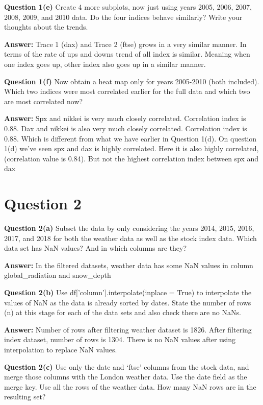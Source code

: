\documentclass[letterpaper,12pt]{article}
\begin{document}
\noindent \textbf{Question 1(e)} Create 4 more subplots, now just using years 2005, 2006, 2007, 2008, 2009, and 2010 data. Do the four indices behave similarly? Write your thoughts about the trends.

\textbf{Answer:} Trace 1 (dax) and Trace 2 (ftse) grows in a very similar manner. In terms of the rate of ups and downs trend of all index is similar. Meaning when one index goes up, other index also goes up in a similar manner. 

\noindent \textbf{Question 1(f)} Now obtain a heat map only for years 2005-2010 (both included). Which two indices were most correlated earlier for the full data and which two are most correlated now? 

\textbf{Answer:} Spx and nikkei is very much closely correlated. Correlation index is 0.88. Dax and nikkei is also very much closely correlated. Correlation index is 0.88. Which is different from what we have earlier in Question 1(d).
On question 1(d) we've seen spx and dax is highly correlated. Here it is also highly correlated, (correlation value is 0.84).
But not the highest correlation index between spx and dax

\section*{Question 2}
\noindent \textbf{Question 2(a)} Subset the data by only considering the years 2014, 2015, 2016, 2017, and 2018 for both the weather data as well as the stock index data. Which data set has NaN values? And in which columns are they? 

\textbf{Answer:} In the filtered datasets, weather data has some NaN values in column global\_radiation and snow\_depth

\noindent \textbf{Question 2(b)} Use df[’column’].interpolate(inplace = True) to interpolate the values of NaN as the data is already sorted by dates. State the number of rows (n) at this stage for each of the data sets and also check there are no NaNs. 

\textbf{Answer:} Number of rows after filtering weather dataset is 1826. After filtering index dataset, number of rows is 1304. There is no NaN values after using interpolation to replace NaN values.

\noindent \textbf{Question 2(c)} Use only the date and ‘ftse’ columns from the stock data, and merge those columns with the London weather data. Use the date field as the merge key. Use all the rows of the weather data. How many NaN rows are in the resulting set? 
\end{document}
